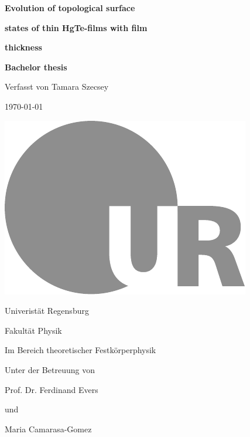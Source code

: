 \documentclass[english, a4, 12pt]{scrartcl}
\begin{document}

	\begin{titlepage}
		\begin{minipage}[c][\textheight][c]{\textwidth}
			\begin{center}
				{ \Huge\textbf{Evolution of topological surface} }
				
				\vspace*{0.3cm}
				{ \Huge \textbf{states of thin HgTe-films with film} }
				
				\vspace*{0.3cm}
				{ \Huge \textbf{thickness} }
				
				\vspace*{1.5cm}
				{\Large \textbf{Bachelor thesis}}
				
				\vspace*{.7cm}
				{\Large Verfasst von Tamara Szecsey}
				
				\vspace*{.5cm}
				{\large \today}
				
				\vspace*{1cm}
				\hspace*{1cm} \includegraphics[height=30ex]{urlogo}
				
				\vspace*{1cm}
				{\large Univeristät Regensburg}
				
				\vspace*{.3cm}
				{\large Fakultät Physik}	
							
				\vspace*{.3cm}
				{\large Im Bereich theoretischer Festkörperphysik}
				
				\vspace*{.7cm}
				{\large Unter der Betreuung von}	
				
				\vspace*{.3cm}
				{\large Prof. Dr. Ferdinand Evers}
				
				\vspace*{.3cm}
				{\large und}	
				
				\vspace*{.3cm}
				{\large Maria Camarasa-Gomez}									
			\end{center}
		\end{minipage}
	\end{titlepage}
\end{document}

